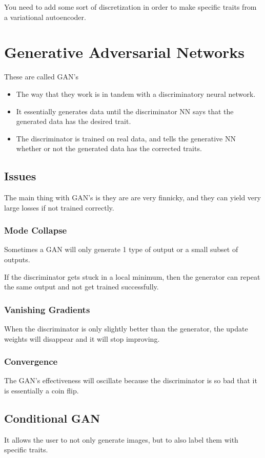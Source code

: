 \documentclass[fleqn]{report}
\begin{document}
You need to add some sort of discretization in order to make specific traits 
from a variational autoencoder. 

\chapter{Generative Adversarial Networks}
These are called GAN's 

\begin{itemize}
    \item
    The way that they work is in tandem with a discriminatory neural network. 
    \item
    It essentially generates data until the discriminator NN says that the generated 
    data has the desired trait. 
    \item
    The discriminator is trained on real data, and tells the generative NN whether 
    or not the generated data has the corrected traits.
\end{itemize}

\section{Issues}
The main thing with GAN's is they are are very finnicky, and they can yield 
very large losses if not trained correctly. 

\subsection{Mode Collapse}
Sometimes a GAN will only generate 1 type of output or a small subset of outputs. 

If the discriminator gets stuck in a local minimum, then the generator can 
repeat the same output and not get trained successfully. 

\subsection{Vanishing Gradients}
When the discriminator is only slightly better than the generator, the update 
weights will disappear and it will stop improving. 

\subsection{Convergence}
The GAN's effectiveness will oscillate because the discriminator is so bad 
that it is essentially a coin flip. 

\section{Conditional GAN}
It allows the user to not only generate images, but to also label them with 
specific traits. 
\end{document}
